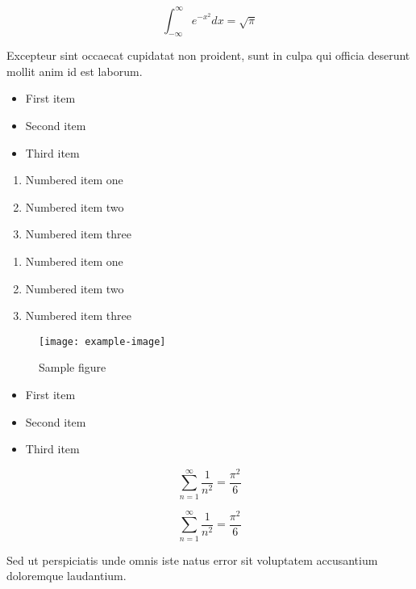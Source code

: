 \documentclass{article}
\begin{document}
\begin{equation}
    \int_{-\infty}^{\infty} e^{-x^2} dx = \sqrt{\pi}
\end{equation}

Excepteur sint occaecat cupidatat non proident, sunt in culpa qui officia deserunt mollit anim id est laborum.

\begin{itemize}
\item First item
\item Second item
\item Third item
\end{itemize}

\begin{enumerate}
\item Numbered item one
\item Numbered item two
\item Numbered item three
\end{enumerate}

\begin{enumerate}
\item Numbered item one
\item Numbered item two
\item Numbered item three
\end{enumerate}

\begin{figure}[h]
    \centering
    \texttt{[image: example-image]}
    \caption{Sample figure}
    \label{fig:sample}
\end{figure}

\begin{itemize}
\item First item
\item Second item
\item Third item
\end{itemize}

\begin{equation}
    \sum_{n=1}^{\infty} \frac{1}{n^2} = \frac{\pi^2}{6}
\end{equation}

\begin{equation}
    \sum_{n=1}^{\infty} \frac{1}{n^2} = \frac{\pi^2}{6}
\end{equation}


Sed ut perspiciatis unde omnis iste natus error sit voluptatem accusantium doloremque laudantium.
\end{document}
